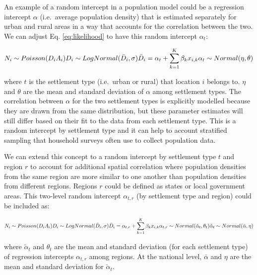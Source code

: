 \documentclass[]{book}
\begin{document}
An example of a random intercept in a population model could be a
regression intercept \(\alpha\) (i.e.~average population density) that
is estimated separately for urban and rural areas in a way that accounts
for the correlation between the two. We can adjust Eq.
\eqref{eq:likelihood} to have this random intercept \(\alpha_t\):

\begin{equation}
  N_i \sim Poisson( D_i A_i ) \\
  D_i \sim LogNormal( \bar{D}_i, \sigma) \\
  \bar{D}_i = \alpha_t + \sum_{k=1}^{K} \beta_k x_{i,k} \\
  \alpha_t \sim Normal(\eta, \theta)
\end{equation}

where \(t\) is the settlement type (i.e.~urban or rural) that location
\(i\) belongs to. \(\eta\) and \(\theta\) are the mean and standard
deviation of \(\alpha\) among settlement types. The correlation between
\(\alpha\) for the two settlement types is explicitly modelled because
they are drawn from the same distribution, but these parameter estimates
will still differ based on their fit to the data from each settlement
type. This is a random intercept by settlement type and it can help to
account stratified sampling that household surveys often use to collect
population data.

We can extend this concept to a random intercept by settlement type
\(t\) and region \(r\) to account for additional spatial correlation
where population densities from the same region are more similar to one
another than population densities from different regions. Regions \(r\)
could be defined as states or local government areas. This two-level
random intercept \(\alpha_{t,r}\) (by settlement type and region) could
be included as:

\begin{equation}
  N_i \sim Poisson( D_i A_i ) \\
  D_i \sim LogNormal( \bar{D}_i, \sigma) \\
  \bar{D}_i = \alpha_{t,r} + \sum_{k=1}^{K} \beta_k x_{i,k} \\ 
  \alpha_{t,r} \sim Normal(\breve{\alpha}_{t}, \theta_{t}) \\
  \breve{\alpha}_{t} \sim Normal(\bar{\alpha}, \eta) 
  \label{eq:intercept}
\end{equation}

where \(\breve{\alpha}_{t}\) and \(\theta_{t}\) are the mean and
standard deviation (for each settlement type) of regression intercepts
\(\alpha_{t,r}\) among regions. At the national level, \(\bar{\alpha}\)
and \(\eta\) are the mean and standard deviation for
\(\breve{\alpha}_{t}\).
\end{document}
